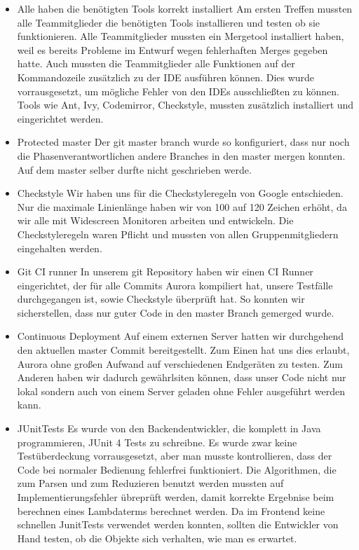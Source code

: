 \documentclass[parskip=full,11pt,twoside]{scrartcl}
\begin{document}
\begin{itemize}
	\item Alle haben die benötigten Tools korrekt installiert
	\newline
	Am ersten Treffen mussten alle Teammitglieder die benötigten Tools installieren und testen ob sie funktionieren. 
	Alle Teammitglieder mussten ein Mergetool installiert haben, weil es bereits Probleme im Entwurf wegen fehlerhaften Merges gegeben hatte.
	Auch mussten die Teammitglieder alle Funktionen auf der Kommandozeile zusätzlich 	zu der IDE ausführen können. Dies wurde vorrausgesetzt, um mögliche Fehler von den IDEs ausschließten zu können.
	Tools wie Ant, Ivy, Codemirror, Checkstyle, mussten zusätzlich installiert und eingerichtet werden. 
	
    \item Protected master
        \newline
        Der git master branch wurde so konfiguriert, dass nur noch die Phasenverantwortlichen andere Branches in den master mergen konnten. 
        Auf dem master selber durfte nicht geschrieben werde.
    \item Checkstyle
    \newline
    Wir haben uns für die Checkstyleregeln von Google entschieden. Nur die maximale Linienlänge haben wir von 100 auf 120 Zeichen erhöht, da wir alle mit Widescreen Monitoren arbeiten und entwickeln. Die Checkstyleregeln waren Pflicht und mussten von allen Gruppenmitgliedern eingehalten werden.
    \item Git CI runner
        \newline
        In unserem git Repository haben wir einen CI Runner eingerichtet, der für alle Commits Aurora kompiliert hat, unsere Testfälle durchgegangen ist, sowie Checkstyle überprüft hat.
        So konnten wir sicherstellen, dass nur guter Code in den master Branch gemerged wurde.
        
    \item Continuous Deployment
        \newline
        Auf einem externen Server hatten wir durchgehend den aktuellen master Commit bereitgestellt.
        Zum Einen hat uns dies erlaubt, Aurora ohne großen Aufwand auf verschiedenen Endgeräten zu testen.
        Zum Anderen haben wir dadurch gewährlsiten können, dass unser Code nicht nur lokal sondern auch von einem Server geladen ohne Fehler ausgeführt werden kann.
          
       \item JUnitTests
       \newline
      	Es wurde von den Backendentwickler, die komplett in Java programmieren, JUnit 4 Tests zu schreibne. 
      	Es wurde zwar keine Testüberdeckung vorrausgesetzt, aber man musste kontrollieren, dass der Code bei normaler Bedienung fehlerfrei funktioniert.
      	 Die Algorithmen, die zum Parsen und zum Reduzieren benutzt werden mussten auf Implementierungsfehler übreprüft werden, damit korrekte Ergebnise beim berechnen eines Lambdaterms berechnet werden.
      	Da im Frontend keine schnellen JunitTests verwendet werden konnten, sollten die Entwickler von Hand testen, ob die Objekte sich verhalten, wie man es erwartet. 
      	\end{itemize}
\end{document}
